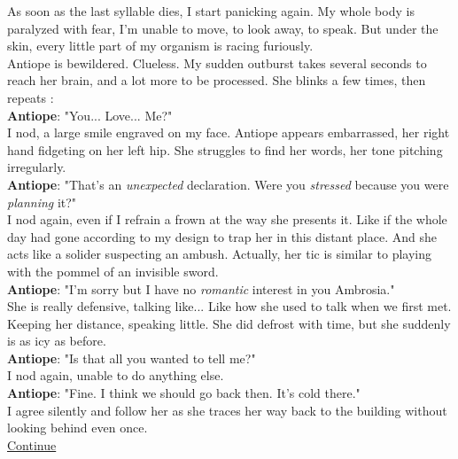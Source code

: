 \documentclass{report}
\newcommand{\speaker}[1]{
	\textbf{#1}: 
}
\newcommand{\glink}[2]{
	\hyperref[#1]{#2}
}
\begin{document}
As soon as the last syllable dies, I start panicking again. My whole body is paralyzed with fear, I'm unable to move, to look away, to speak. But under the skin, every little part of my organism is racing furiously.\\

Antiope is bewildered. Clueless. My sudden outburst takes several seconds to reach her brain, and a lot more to be processed. She blinks a few times, then repeats :\\

\speaker{Antiope} "You... Love... Me?"\\

I nod, a large smile engraved on my face. Antiope appears embarrassed, her right hand fidgeting on her left hip. She struggles to find her words, her tone pitching irregularly.\\

\speaker{Antiope} "That's an \emph{unexpected} declaration. Were you \emph{stressed} because you were \emph{planning} it?"\\

I nod again, even if I refrain a frown at the way she presents it. Like if the whole day had gone according to my design to trap her in this distant place. And she acts like a solider suspecting an ambush. Actually, her tic is similar to playing with the pommel of an invisible sword.\\

\speaker{Antiope} "I'm sorry but I have no \emph{romantic} interest in you Ambrosia."\\

She is really defensive, talking  like... Like how she used to talk when we first met. Keeping her distance, speaking little. She did defrost with time, but she suddenly is as icy as before.\\

\speaker{Antiope} "Is that all you wanted to tell me?"\\

I nod again, unable to do anything else.\\

\speaker{Antiope} "Fine. I think we should go back then. It's cold there."\\

I agree silently and follow her as she traces her way back to the building without looking behind even once.\\

\glink{Masks}{Continue}
\end{document}
